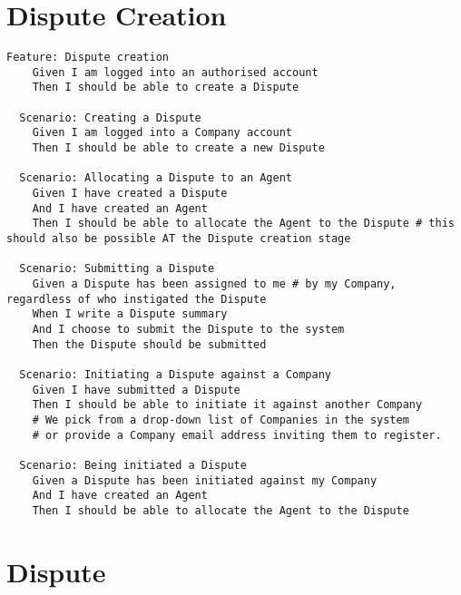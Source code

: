 \section{Dispute Creation}

\begin{lstlisting}
Feature: Dispute creation
    Given I am logged into an authorised account
    Then I should be able to create a Dispute
    
  Scenario: Creating a Dispute
    Given I am logged into a Company account
    Then I should be able to create a new Dispute

  Scenario: Allocating a Dispute to an Agent
    Given I have created a Dispute
    And I have created an Agent
    Then I should be able to allocate the Agent to the Dispute # this should also be possible AT the Dispute creation stage

  Scenario: Submitting a Dispute
    Given a Dispute has been assigned to me # by my Company, regardless of who instigated the Dispute
    When I write a Dispute summary
    And I choose to submit the Dispute to the system
    Then the Dispute should be submitted

  Scenario: Initiating a Dispute against a Company
    Given I have submitted a Dispute
    Then I should be able to initiate it against another Company
    # We pick from a drop-down list of Companies in the system
    # or provide a Company email address inviting them to register.

  Scenario: Being initiated a Dispute
    Given a Dispute has been initiated against my Company
    And I have created an Agent
    Then I should be able to allocate the Agent to the Dispute
\end{lstlisting}

\section{Dispute}

